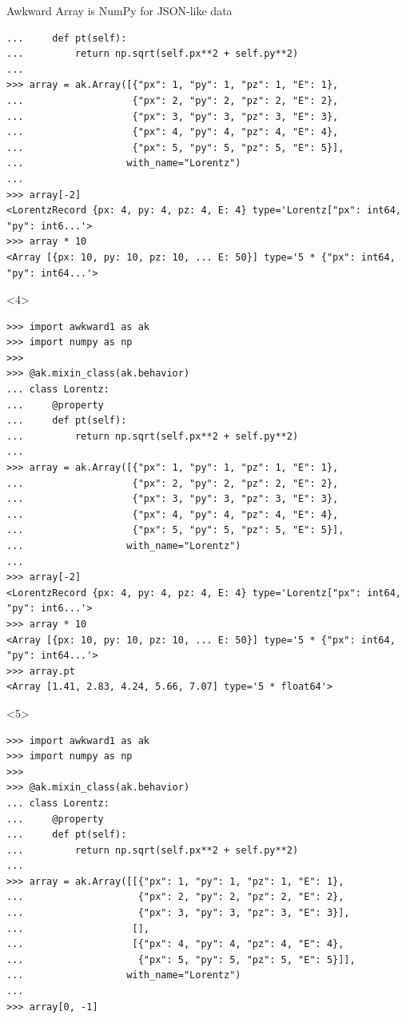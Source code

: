\documentclass[aspectratio=169]{beamer}
\begin{document}
\begin{frame}[fragile]{Awkward Array is NumPy for JSON-like data}
\begin{onlyenv}
\begin{verbatim}
...     def pt(self):
...         return np.sqrt(self.px**2 + self.py**2)
... 
>>> array = ak.Array([{"px": 1, "py": 1, "pz": 1, "E": 1},
...                   {"px": 2, "py": 2, "pz": 2, "E": 2},
...                   {"px": 3, "py": 3, "pz": 3, "E": 3},
...                   {"px": 4, "py": 4, "pz": 4, "E": 4},
...                   {"px": 5, "py": 5, "pz": 5, "E": 5}],
...                  with_name="Lorentz")
... 
>>> array[-2]
<LorentzRecord {px: 4, py: 4, pz: 4, E: 4} type='Lorentz["px": int64, "py": int6...'>
>>> array * 10
<Array [{px: 10, py: 10, pz: 10, ... E: 50}] type='5 * {"px": int64, "py": int64...'>
\end{verbatim}
\vspace{3 cm}
\end{onlyenv}
\begin{onlyenv}<4>
\begin{verbatim}
>>> import awkward1 as ak
>>> import numpy as np
>>> 
>>> @ak.mixin_class(ak.behavior)
... class Lorentz:
...     @property
...     def pt(self):
...         return np.sqrt(self.px**2 + self.py**2)
... 
>>> array = ak.Array([{"px": 1, "py": 1, "pz": 1, "E": 1},
...                   {"px": 2, "py": 2, "pz": 2, "E": 2},
...                   {"px": 3, "py": 3, "pz": 3, "E": 3},
...                   {"px": 4, "py": 4, "pz": 4, "E": 4},
...                   {"px": 5, "py": 5, "pz": 5, "E": 5}],
...                  with_name="Lorentz")
... 
>>> array[-2]
<LorentzRecord {px: 4, py: 4, pz: 4, E: 4} type='Lorentz["px": int64, "py": int6...'>
>>> array * 10
<Array [{px: 10, py: 10, pz: 10, ... E: 50}] type='5 * {"px": int64, "py": int64...'>
>>> array.pt
<Array [1.41, 2.83, 4.24, 5.66, 7.07] type='5 * float64'>
\end{verbatim}
\vspace{3 cm}
\end{onlyenv}
\begin{onlyenv}<5>
\begin{verbatim}
>>> import awkward1 as ak
>>> import numpy as np
>>> 
>>> @ak.mixin_class(ak.behavior)
... class Lorentz:
...     @property
...     def pt(self):
...         return np.sqrt(self.px**2 + self.py**2)
... 
>>> array = ak.Array([[{"px": 1, "py": 1, "pz": 1, "E": 1},
...                    {"px": 2, "py": 2, "pz": 2, "E": 2},
...                    {"px": 3, "py": 3, "pz": 3, "E": 3}],
...                   [],
...                   [{"px": 4, "py": 4, "pz": 4, "E": 4},
...                    {"px": 5, "py": 5, "pz": 5, "E": 5}]],
...                  with_name="Lorentz")
... 
>>> array[0, -1]

\end{verbatim}
\end{onlyenv}
\end{frame}
\end{document}
